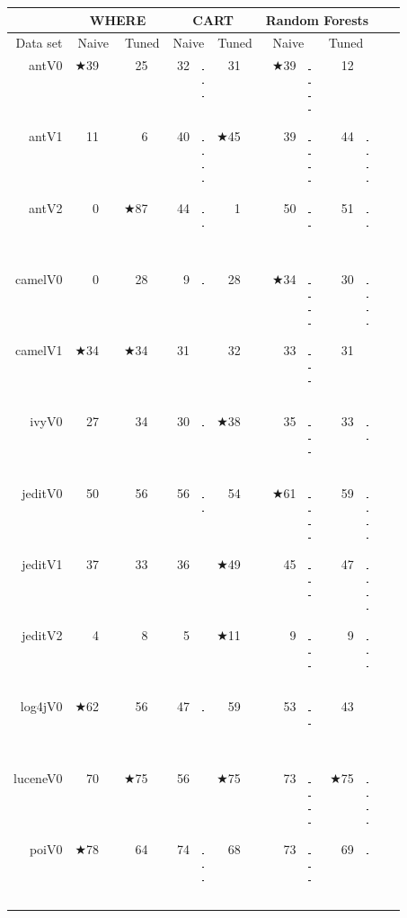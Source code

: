 \documentclass{acm_proc_article-sp}
\newcommand{\crule}[3][darkgray]{\textcolor{#1}{\rule{#2}{#3}}}
\newcommand{\rone}{\crule{1mm}{1.95mm}}
\newcommand{\rtwo}{\crule{1mm}{1.95mm}\hspace{0.3pt}\crule{1mm}{1.95mm}}
\newcommand{\rthree}{\crule{1mm}{1.95mm}\hspace{0.3pt}\crule{1mm}{1.95mm}\hspace{0.3pt}\crule{1mm}{1.95mm}}
\newcommand{\rfour}{\crule{1mm}{1.95mm}\hspace{0.3pt}\crule{1mm}{1.95mm}\hspace{0.3pt}\crule{1mm}{1.95mm}\hspace{0.3pt}\crule{1mm}{1.95mm}}
\begin{document}
\begin{figure}
\renewcommand{\baselinestretch}{0.8} 

\scriptsize  
\begin{tabular}{r|r@{~}l@{~}|r@{~}l|r@{~}l|r@{~}l|r@{~}l@{~}|r@{~}l@{~}r@{~}l}
      &   \multicolumn{4}{c|}{WHERE}         &   \multicolumn{4}{c|}{CART}         &   \multicolumn{4}{c}{Random Forests}         \\\hline
  Data set   &   \multicolumn{2}{c}{Naive}         &   \multicolumn{2}{c|}{Tuned}         &   \multicolumn{2}{c}{Naive}         &   \multicolumn{2}{c|}{Tuned}    &   \multicolumn{2}{c}{Naive}  &   \multicolumn{2}{c}{Tuned}\\\hline
antV0 & $\bigstar$39 & {\rfour} & 25 & {\rtwo} & 32 & {\rthree} & 31 & {\rthree} & $\bigstar$39 & {\rfour} & 12 &        \\
antV1 & 11 &         & 6 &         & 40 & {\rfour} & $\bigstar$45 & {\rfour} & 39 & {\rfour} & 44 & {\rfour}\\
antV2 & 0 &         & $\bigstar$87 & {\rfour} & 44 & {\rtwo} & 1 &         & 50 & {\rtwo} & 51 & {\rtwo}\\
camelV0 & 0 &         & 28 & {\rfour} & 9 & {\rone} & 28 & {\rfour} & $\bigstar$34 & {\rfour} & 30 & {\rfour}\\
camelV1 & $\bigstar$34 & {\rfour} & $\bigstar$34 & {\rfour} & 31 &         & 32 & {\rone} & 33 & {\rthree} & 31 &        \\
ivyV0 & 27 &         & 34 & {\rthree} & 30 & {\rone} & $\bigstar$38 & {\rfour} & 35 & {\rthree} & 33 & {\rtwo}\\
jeditV0 & 50 &         & 56 & {\rtwo} & 56 & {\rtwo} & 54 & {\rone} & $\bigstar$61 & {\rfour} & 59 & {\rfour}\\
jeditV1 & 37 & {\rone} & 33 &         & 36 &         & $\bigstar$49 & {\rfour} & 45 & {\rthree} & 47 & {\rfour}\\
jeditV2 & 4 &         & 8 & {\rtwo} & 5 &         & $\bigstar$11 & {\rfour} & 9 & {\rthree} & 9 & {\rthree}\\
log4jV0 & $\bigstar$62 & {\rfour} & 56 & {\rthree} & 47 & {\rone} & 59 & {\rfour} & 53 & {\rtwo} & 43 &        \\
luceneV0 & 70 & {\rthree} & $\bigstar$75 & {\rfour} & 56 &         & $\bigstar$75 & {\rfour} & 73 & {\rfour} & $\bigstar$75 & {\rfour}\\
poiV0 & $\bigstar$78 & {\rfour} & 64 &         & 74 & {\rthree} & 68 & {\rone} & 73 & {\rthree} & 69 & {\rone}\\

\end{tabular}
\end{figure}
\end{document}
